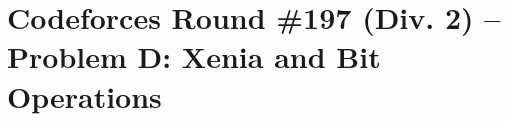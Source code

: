 \section{Codeforces Round \#197 (Div. 2) -- Problem D: Xenia and Bit Operations}










%
%
%
%
%
%
%
%

